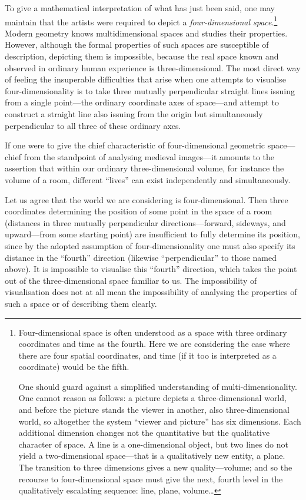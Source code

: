 To give a mathematical interpretation of what has just been said, one may maintain that
the artists were required to depict a \emph{four-dimensional space}.\footnote{Four-dimensional
  space is often understood as a space with three ordinary coordinates and time as the
  fourth.  Here we are considering the case where there are four spatial coordinates,
  and time (if it too is interpreted as a coordinate) would be the fifth.

  One should guard against a simplified understanding of multi-dimensionality.  One
  cannot reason as follows: a picture depicts a three-dimensional world, and before the
  picture stands the viewer in another, also three-dimensional world, so altogether the
  system ``viewer and picture'' has six dimensions.  Each additional dimension changes
  not the quantitative but the qualitative character of space.  A line is a one-dimensional
  object, but two lines do not yield a two-dimensional space---that is a qualitatively new
  entity, a plane.  The transition to three dimensions gives a new quality---volume; and
  so the recourse to four-dimensional space must give the next, fourth level in the
  qualitatively escalating sequence: line, plane, volume\ldots}  Modern geometry knows
multidimensional spaces and studies their properties.  However, although the formal
properties of such spaces are susceptible of description, depicting them is impossible,
because the real space known and observed in ordinary human experience is three-dimensional.
The most direct way of feeling the insuperable difficulties that arise when one attempts
to visualise four-dimensionality is to take three mutually perpendicular straight lines
issuing from a single point---the ordinary coordinate axes of space---and attempt to
construct a straight line also issuing from the origin but simultaneously perpendicular
to all three of these ordinary axes.

If one were to give the chief characteristic of four-dimensional geometric space---chief
from the standpoint of analysing medieval images---it amounts to the assertion that within
our ordinary three-dimensional volume, for instance the volume of a room, different
``lives'' can exist independently and simultaneously.

Let us agree that the world we are considering is four-dimensional.  Then three coordinates
determining the position of some point in the space of a room (distances in three mutually
perpendicular directions---forward, sideways, and upward---from some starting point) are
insufficient to fully determine its position, since by the adopted assumption of
four-dimensionality one must also specify its distance in the ``fourth'' direction
(likewise ``perpendicular'' to those named above).  It is impossible to visualise this
``fourth'' direction, which takes the point out of the three-dimensional space familiar
to us.  The impossibility of visualisation does not at all mean the impossibility of
analysing the properties of such a space or of describing them clearly.

